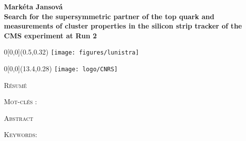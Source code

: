
%



\newpage
\thispagestyle{empty}



\vspace*{1.5cm}
\begin{center}
    \textbf{\Large{Mark\'{e}ta Jansov\'{a}}}\\
\vspace*{0.5cm}
    \textbf{\Large{Search for the supersymmetric partner of the top quark and measurements of cluster properties in the silicon strip tracker of the CMS experiment at Run 2\vspace*{0.3cm}}}
\end{center}

\begin{textblock}{0}[0,0](0.5,0.32)
{
    \setlength{\fboxsep}{0.7pt}
    \setlength{\fboxrule}{1pt}
    \texttt{[image: figures/lunistra]}
}
\end{textblock}
\begin{textblock}{0}[0,0](13.4,0.28)
{
    \setlength{\fboxsep}{0.7pt}
    \setlength{\fboxrule}{1pt}
    \texttt{[image: logo/CNRS]}
}
\end{textblock}
\small
\begin{framed}
    \vspace*{-0.7cm}
\begin{center}\textsc{Résumé}\end{center}
    \vspace*{-0.4cm}

    \textsc{Mot-clés} : %
\end{framed}
\vspace*{-0.2cm}
\begin{framed}
    \vspace*{-0.7cm}
\begin{center}\textsc{Abstract}\end{center}
    \vspace*{-0.4cm}

    \textsc{Keywords}: %
\end{framed}
